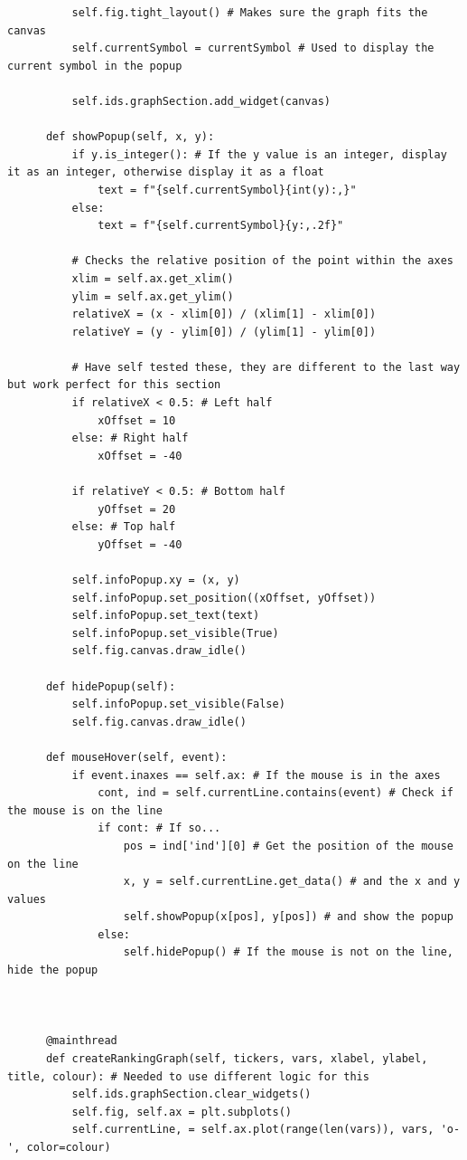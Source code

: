 \documentclass{article}
\begin{document}
\begin{verbatim}
          self.fig.tight_layout() # Makes sure the graph fits the canvas
          self.currentSymbol = currentSymbol # Used to display the current symbol in the popup
          
          self.ids.graphSection.add_widget(canvas)

      def showPopup(self, x, y):
          if y.is_integer(): # If the y value is an integer, display it as an integer, otherwise display it as a float
              text = f"{self.currentSymbol}{int(y):,}"
          else:
              text = f"{self.currentSymbol}{y:,.2f}"

          # Checks the relative position of the point within the axes
          xlim = self.ax.get_xlim()
          ylim = self.ax.get_ylim()
          relativeX = (x - xlim[0]) / (xlim[1] - xlim[0])
          relativeY = (y - ylim[0]) / (ylim[1] - ylim[0])
      
          # Have self tested these, they are different to the last way but work perfect for this section
          if relativeX < 0.5: # Left half
              xOffset = 10
          else: # Right half
              xOffset = -40

          if relativeY < 0.5: # Bottom half
              yOffset = 20
          else: # Top half
              yOffset = -40
      
          self.infoPopup.xy = (x, y)
          self.infoPopup.set_position((xOffset, yOffset))
          self.infoPopup.set_text(text)
          self.infoPopup.set_visible(True)
          self.fig.canvas.draw_idle()

      def hidePopup(self):
          self.infoPopup.set_visible(False)
          self.fig.canvas.draw_idle()

      def mouseHover(self, event):
          if event.inaxes == self.ax: # If the mouse is in the axes
              cont, ind = self.currentLine.contains(event) # Check if the mouse is on the line
              if cont: # If so...
                  pos = ind['ind'][0] # Get the position of the mouse on the line
                  x, y = self.currentLine.get_data() # and the x and y values
                  self.showPopup(x[pos], y[pos]) # and show the popup
              else:
                  self.hidePopup() # If the mouse is not on the line, hide the popup



      @mainthread
      def createRankingGraph(self, tickers, vars, xlabel, ylabel, title, colour): # Needed to use different logic for this
          self.ids.graphSection.clear_widgets()
          self.fig, self.ax = plt.subplots()
          self.currentLine, = self.ax.plot(range(len(vars)), vars, 'o-', color=colour)
      

\end{verbatim}
\end{document}
